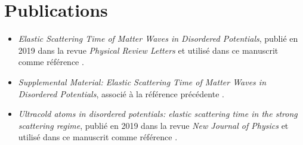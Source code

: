 \chapter{Publications}
\begin{itemize}
\item[\textendash] \emph{Elastic Scattering Time of Matter Waves in Disordered Potentials}, publié en 2019 dans la revue \emph{Physical Review Letters} et utilisé dans ce manuscrit comme référence \citep{richard2019elastic}.
\item[\textendash] \emph{Supplemental Material: Elastic Scattering Time of Matter Waves in Disordered Potentials}, associé à la référence précédente \citep{richard2019elastic}.
\item[\textendash] \emph{Ultracold atoms in disordered potentials: elastic scattering time in the strong scattering regime}, publié en 2019 dans la revue \emph{New Journal of Physics} et utilisé dans ce manuscrit comme référence \citep{signoles2019ultracold}.
\end{itemize}



